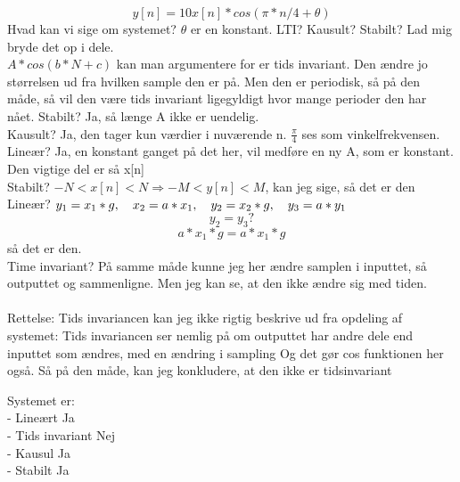 \begin{Opgaver}
\begin{kapitel}
        \begin{Opgave}
            \[y[n] = 10x[n]*cos(\pi*n/4 + \theta)\]
            Hvad kan vi sige om systemet? $\theta$ er en konstant. 
            LTI? Kausult? Stabilt? Lad mig bryde det op i dele.\\ 
            $A*cos(b*N + c)$ kan man argumentere for er tids invariant. Den ændre jo størrelsen ud fra hvilken sample den er på. 
            Men den er periodisk, så på den måde, så vil den være tids invariant ligegyldigt hvor mange perioder den har nået. 
            Stabilt? Ja, så længe A ikke er uendelig. \\
            Kausult? Ja, den tager kun værdier i nuværende n. $\frac{\pi}{4}$ ses som vinkelfrekvensen.
            Lineær? Ja, en konstant ganget på det her, vil medføre en ny A, som er konstant. \\
            Den vigtige del er så x[n]\\ 
            Stabilt? $-N < x[n] < N \Rightarrow -M < y[n] < M$, kan jeg sige, så det er den
            Lineær? $y_1 = x_1 * g, \quad x_2 = a * x_1, \quad y_2 = x_2 * g, \quad y_3 = a*y_1$
            \[y_2 = y_3 ?\]
            \[a*x_1 * g = a * x_1 * g\]
            så det er den.\\
            Time invariant? På samme måde kunne jeg her ændre samplen i inputtet, så outputtet og sammenligne. 
            Men jeg kan se, at den ikke ændre sig med tiden. \\\\

            Rettelse: Tids invariancen kan jeg ikke rigtig beskrive ud fra opdeling af systemet: 
            Tids invariancen ser nemlig på om outputtet har andre dele end inputtet som ændres, med en ændring i sampling
            Og det gør cos funktionen her også. Så på den måde, kan jeg konkludere, at den ikke er tidsinvariant

            Systemet er: \\
            - Lineært Ja \\ 
            - Tids invariant Nej \\
            - Kausul Ja \\
            - Stabilt Ja \\

        \end{Opgave}


\end{kapitel}
\end{Opgaver}
